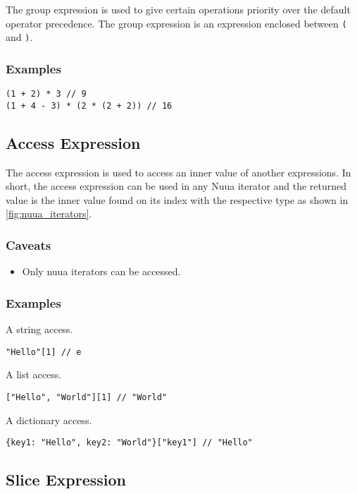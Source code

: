 The group expression is used to give certain operations priority over the default operator precedence.
The group expression is an expression enclosed between \texttt{(} and \texttt{)}.

\subsubsection{Examples}

\begin{lstlisting}
(1 + 2) * 3 // 9
(1 + 4 - 3) * (2 * (2 + 2)) // 16
\end{lstlisting}

\subsection{Access Expression}

The access expression is used to access an inner value of another expressions. In short, the access expression can be used in any
Nuua iterator and the returned value is the inner value found on its index with the respective type as shown in \autoref{fig:nuua_iterators}.

\subsubsection{Caveats}

\begin{itemize}
    \item Only nuua iterators can be accessed.
\end{itemize}

\subsubsection{Examples}

A string access.
\begin{lstlisting}
"Hello"[1] // e
\end{lstlisting}
A list access.
\begin{lstlisting}
["Hello", "World"][1] // "World"
\end{lstlisting}
A dictionary access.
\begin{lstlisting}
{key1: "Hello", key2: "World"}["key1"] // "Hello"
\end{lstlisting}

\subsection{Slice Expression}

